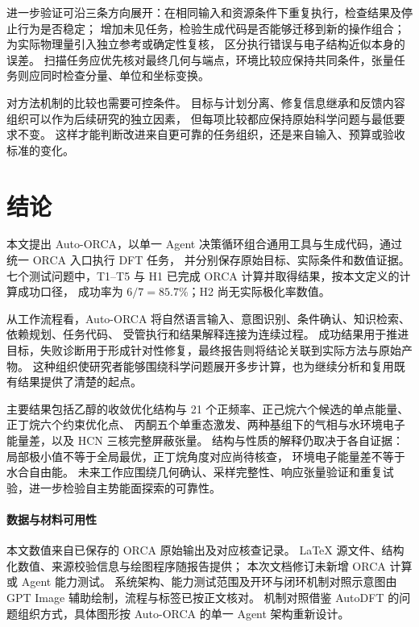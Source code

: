 \documentclass[UTF8,fontset=fandol,a4paper,11pt]{ctexart}
\begin{document}
进一步验证可沿三条方向展开：在相同输入和资源条件下重复执行，检查结果及停止行为是否稳定；%
增加未见任务，检验生成代码是否能够迁移到新的操作组合；为实际物理量引入独立参考或确定性复核，%
区分执行错误与电子结构近似本身的误差。%
扫描任务应优先核对最终几何与端点，环境比较应保持共同条件，张量任务则应同时检查分量、单位和坐标变换。

对方法机制的比较也需要可控条件。%
目标与计划分离、修复信息继承和反馈内容组织可以作为后续研究的独立因素，%
但每项比较都应保持原始科学问题与最低要求不变。%
这样才能判断改进来自更可靠的任务组织，还是来自输入、预算或验收标准的变化。

\section{结论}
本文提出 Auto-ORCA，以单一 Agent 决策循环组合通用工具与生成代码，通过统一 ORCA 入口执行 DFT 任务，%
并分别保存原始目标、实际条件和数值证据。%
七个测试问题中，T1--T5 与 H1 已完成 ORCA 计算并取得结果，按本文定义的计算成功口径，%
成功率为 $6/7=85.7\%$；H2 尚无实际极化率数值。

从工作流程看，Auto-ORCA 将自然语言输入、意图识别、条件确认、知识检索、依赖规划、任务代码、%
受管执行和结果解释连接为连续过程。%
成功结果用于推进目标，失败诊断用于形成针对性修复，最终报告则将结论关联到实际方法与原始产物。%
这种组织使研究者能够围绕科学问题展开多步计算，也为继续分析和复用既有结果提供了清楚的起点。

主要结果包括乙醇的收敛优化结构与 21 个正频率、正己烷六个候选的单点能量、正丁烷六个约束优化点、%
丙酮五个单重态激发、两种基组下的气相与水环境电子能量差，以及 HCN 三核完整屏蔽张量。%
结构与性质的解释仍取决于各自证据：局部极小值不等于全局最优，正丁烷角度对应尚待核查，%
环境电子能量差不等于水合自由能。%
未来工作应围绕几何确认、采样完整性、响应张量验证和重复试验，进一步检验自主势能面探索的可靠性。

\paragraph{数据与材料可用性}
本文数值来自已保存的 ORCA 原始输出及对应核查记录。%
LaTeX 源文件、结构化数值、来源校验信息与绘图程序随报告提供；%
本次文档修订未新增 ORCA 计算或 Agent 能力测试。%
系统架构、能力测试范围及开环与闭环机制对照示意图由 GPT Image 辅助绘制，流程与标签已按正文核对。%
机制对照借鉴 AutoDFT 的问题组织方式，具体图形按 Auto-ORCA 的单一 Agent 架构重新设计。

\medskip
\renewcommand{\refname}{参考文献}
\begingroup
\footnotesize
\linespread{1.05}\selectfont
{}

\endgroup
\end{document}
